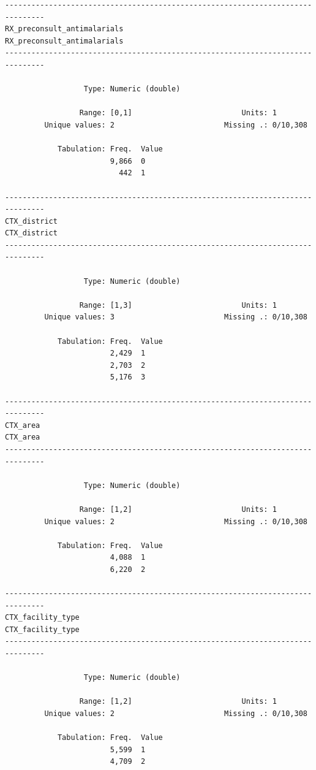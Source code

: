 \documentclass[
  letterpaper,
  DIV=11,
  numbers=noendperiod,
  oneside]{scrreprt}
\begin{document}
\begin{verbatim}
-------------------------------------------------------------------------------
RX_preconsult_antimalarials                         RX_preconsult_antimalarials
-------------------------------------------------------------------------------

                  Type: Numeric (double)

                 Range: [0,1]                         Units: 1
         Unique values: 2                         Missing .: 0/10,308

            Tabulation: Freq.  Value
                        9,866  0
                          442  1

-------------------------------------------------------------------------------
CTX_district                                                       CTX_district
-------------------------------------------------------------------------------

                  Type: Numeric (double)

                 Range: [1,3]                         Units: 1
         Unique values: 3                         Missing .: 0/10,308

            Tabulation: Freq.  Value
                        2,429  1
                        2,703  2
                        5,176  3

-------------------------------------------------------------------------------
CTX_area                                                               CTX_area
-------------------------------------------------------------------------------

                  Type: Numeric (double)

                 Range: [1,2]                         Units: 1
         Unique values: 2                         Missing .: 0/10,308

            Tabulation: Freq.  Value
                        4,088  1
                        6,220  2

-------------------------------------------------------------------------------
CTX_facility_type                                             CTX_facility_type
-------------------------------------------------------------------------------

                  Type: Numeric (double)

                 Range: [1,2]                         Units: 1
         Unique values: 2                         Missing .: 0/10,308

            Tabulation: Freq.  Value
                        5,599  1
                        4,709  2
\end{verbatim}
\end{document}
